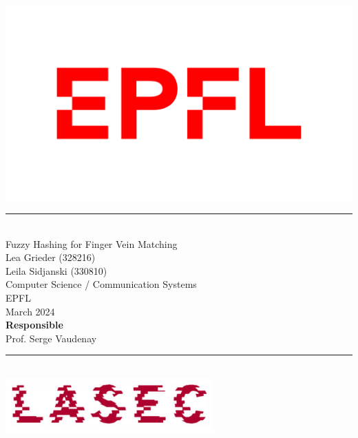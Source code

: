 \documentclass[12pt, a4paper, openany]{article}
\begin{document}
\begin{titlepage}
  \centering
  \includegraphics[width=0.3\linewidth]{latex-img/logo-epfl.png}\\[0.2cm]
  \rule{\textwidth}{0.4pt}\\[2cm]
  {\LARGE Fuzzy Hashing for Finger Vein Matching}\\[2cm]
  {\normalsize Lea Grieder (328216)\\[0.2cm]Leila Sidjanski (330810)}\\[2cm]
  {\normalsize Computer Science / Communication Systems\\[0.2cm]EPFL}\\[2cm]
  {\normalsize March 2024}\\[2cm]

  {\normalsize\bfseries Responsible}\\[0.2cm]
  {\normalsize Prof. Serge Vaudenay}\\[2cm]
  \rule{\textwidth}{0.3pt}\\[2cm]
  \includegraphics[width=0.3\linewidth]{latex-img/lasec.jpg}\\[0.2cm]
\end{titlepage}


\newpage
\tableofcontents
\thispagestyle{fancy}

\newpage









\newpage
\printbibliography[heading=bibintoc, title={References}]
\end{document}
